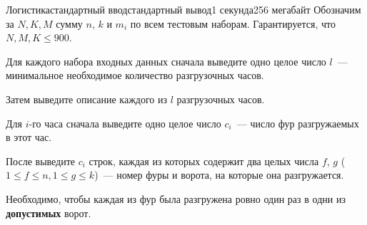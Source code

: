 \begin{problem}{Логистика}{стандартный ввод}{стандартный вывод}{1 секунда}{256 мегабайт}
    Обозначим за $N, K, M$ сумму $n$, $k$ и $m_i$ по всем тестовым наборам.
    Гарантируется, что $N, M, K \leq 900$.

    \OutputFile
    Для каждого набора входных данных сначала выведите одно целое число $l$~--- минимальное необходимое количество разгрузочных часов.

    Затем выведите описание каждого из $l$ разгрузочных часов.

    Для $i$-го часа сначала выведите одно целое число $c_i$~--- число фур разгружаемых в этот час.

    После выведите $c_i$ строк, каждая из которых содержит два целых числа $f$, $g$ ($1 \leq f \leq n, 1 \leq g \leq k$)~--- номер фуры и ворота, на которые она разгружается.

    Необходимо, чтобы каждая из фур была разгружена ровно один раз в одни из \textbf{допустимых} ворот.

    \Example

    \begin{example}
    \end{example}

\end{problem}